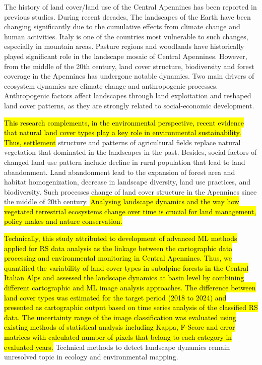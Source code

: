 \documentclass[jimaging,article,submit,pdftex,moreauthors]{Definitions/mdpi}
\begin{document}
The history of land cover/land use of the Central Apennines has been reported in previous studies. During recent decades, The landscapes of the Earth have been changing significantly due to the cumulative effects from climate change and human activities. Italy is one of the countries most vulnerable to such changes, especially in mountain areas. Pasture regions and woodlands have historically played significant role in the landscape mosaic of Central Apennines. However, from the middle of the 20th century, land cover structure, biodiversity and forest coverage in the Apennines has undergone notable dynamics. Two main drivers of ecosystem dynamics are climate change and anthropogenic processes. Anthropogenic factors affect landscapes through land exploitation and reshaped land cover patterns, as they are strongly related to social-economic development. 

\hl{This research complements, in the environmental perspective, recent evidence that natural land cover types play a key role in environmental sustainability. Thus, settlement} structure and patterns of agricultural fields replace natural vegetation that dominated in the landscapes in the past. Besides, social factors of changed land use pattern include decline in rural population that lead to land abandonment. Land abandonment lead to the expansion of forest area and habitat homogenization, decrease in landscape diversity, land use practices, and biodiversity. Such processes change of land cover structure in the Apennines since the middle of 20th century. \hl{Analysing landscape dynamics and  the way how vegetated terrestrial ecosystems change over time is crucial for land management, policy makes and nature conservation.}

\hl{Technically, this study attributed to development of advanced ML methods applied for RS data analysis as the linkage between the cartographic data processing and environmental monitoring in Central Apennines. Thus, we quantified the variability of land cover types in subalpine forests in the Central Italian Alps and assessed the landscape dynamics at basin level by combining different cartographic and ML image analysis approaches. The difference between land cover types was estimated for the target period (2018 to 2024) and presented as cartographic output based on time series analysis of the classified RS data. The uncertainty range of the image classification was evaluated using existing methods of statistical analysis including Kappa, F-Score and error matrices with calculated number of pixels that belong to each category in evaluated years. }Technical methods to detect\hl{ }landscape dynamics remain unresolved topic in ecology and environmental mapping. 
\end{document}
